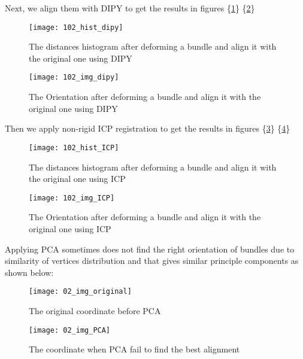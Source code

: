 \documentclass[../structure.tex]{subfiles}
\begin{document}
Next, we align them with DIPY to get the results in figures \{\ref{fig:hist_dipy_def}\} \{\ref{fig:img_dipy_def}\}

\begin{figure}[h!]
\centering
\texttt{[image: 102\_hist\_dipy]}
\captionsetup{justification=centering}
\caption{The distances histogram after deforming a bundle and align it with the original one using DIPY}
\label{fig:hist_dipy_def}
\end{figure}

\begin{figure}[h!]
\centering
\texttt{[image: 102\_img\_dipy]}
\captionsetup{justification=centering}
\caption{The Orientation after deforming a bundle and align it with the original one using DIPY}
\label{fig:img_dipy_def}
\end{figure}
\pagebreak
Then we apply non-rigid ICP registration to get the results in figures \{\ref{fig:hist_icp_def}\} \{\ref{fig:img_icp_def}\}

\begin{figure}[h!]
\centering
\texttt{[image: 102\_hist\_ICP]}
\captionsetup{justification=centering}
\caption{The distances histogram after deforming a bundle and align it with the original one using ICP}
\label{fig:hist_icp_def}
\end{figure}

\begin{figure}[h!]
\centering
\texttt{[image: 102\_img\_ICP]}
\captionsetup{justification=centering}
\caption{The Orientation after deforming a bundle and align it with the original one using ICP}
\label{fig:img_icp_def}
\end{figure}

\pagebreak

Applying PCA sometimes does not find the right orientation of bundles due to similarity of vertices distribution and that gives similar principle components as shown below:


	\begin{figure}[h!]
	\centering
	\texttt{[image: 02\_img\_original]}
	\captionsetup{justification=centering}
	\caption{The original coordinate before PCA}
	\label{fig:all_brain}
	\end{figure}
	
	\begin{figure}[h!]
	\centering
	\texttt{[image: 02\_img\_PCA]}
	\captionsetup{justification=centering}
	\caption{The coordinate when PCA fail to find the best alignment}
	\label{fig:all_brain}
	\end{figure}
\pagebreak
\end{document}
